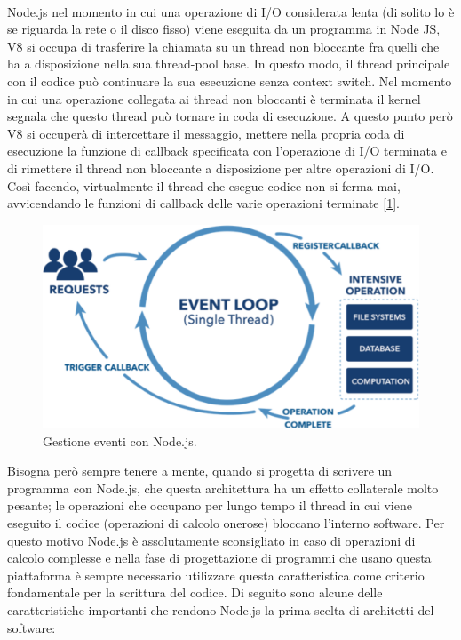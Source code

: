 \\Node.js nel momento in cui una operazione di I/O considerata lenta (di solito lo è se riguarda la rete o il disco fisso) viene eseguita da un programma in Node JS, V8 si occupa di trasferire la chiamata su un thread non bloccante fra quelli che ha a disposizione nella sua thread-pool base. In questo modo, il thread principale con il codice può continuare la sua esecuzione senza context switch. Nel momento in cui una operazione collegata ai thread non bloccanti è terminata il kernel segnala che questo thread può tornare in coda di esecuzione. A questo punto però V8 si occuperà di intercettare il messaggio, mettere nella propria coda di esecuzione la funzione di callback specificata con l'operazione di I/O terminata e di rimettere il thread non bloccante a disposizione per altre operazioni di I/O. Così facendo, virtualmente il thread che esegue codice non si ferma mai, avvicendando le funzioni di callback delle varie operazioni terminate [\ref{fig:nodeEvent}].
\begin{figure}[H]
	\centering
	\includegraphics[width=\textwidth]{images/nodeEvent.png}
	\caption{Gestione eventi con Node.js.}
	\label{fig:nodeEvent}
\end{figure}
Bisogna però sempre tenere a mente, quando si progetta di scrivere un programma con Node.js, che questa architettura ha un effetto collaterale molto pesante; le operazioni che occupano per lungo tempo il thread in cui viene eseguito il codice (operazioni di calcolo onerose) bloccano l'interno software. Per questo motivo Node.js è assolutamente sconsigliato in caso di operazioni di calcolo complesse e nella fase di progettazione di programmi che usano questa piattaforma è sempre necessario utilizzare questa caratteristica come criterio fondamentale per la scrittura del codice.
Di seguito sono alcune delle caratteristiche importanti che rendono Node.js la prima scelta di architetti del software:
